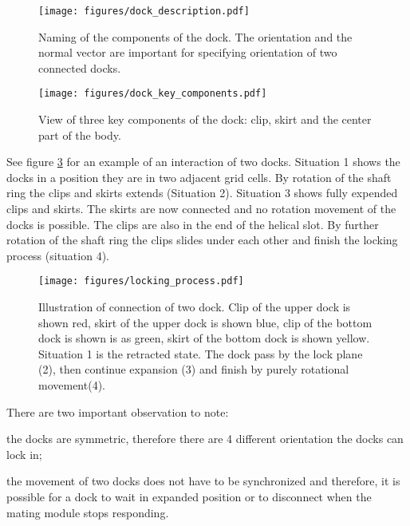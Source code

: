 \begin{figure}[h!]
    \centering
    \texttt{[image: figures/dock\_description.pdf]}
    \caption{Naming of the components of the dock. The orientation and the
    normal vector are important for specifying orientation of two connected
    docks. }
    \label{fig:dock_description}
\end{figure}

\begin{figure}[h!]
    \centering
    \texttt{[image: figures/dock\_key\_components.pdf]}
    \caption{View of three key components of the dock: clip, skirt and the
    center part of the body.}
    \label{fig:dock_key_components}
\end{figure}

See figure \ref{fig:dock_locking_process} for an example of an interaction of
two docks. Situation 1 shows the docks in a position they are in two adjacent
grid cells. By rotation of the shaft ring the clips and skirts extends
(Situation 2). Situation 3 shows fully expended clips and skirts. The skirts are
now connected and no rotation movement of the docks is possible. The clips are
also in the end of the helical slot. By further rotation of the shaft ring the
clips slides under each other and finish the locking process (situation 4).

\begin{figure}[h!]
    \centering
    \texttt{[image: figures/locking\_process.pdf]}
    \caption{Illustration of connection of two dock. Clip of the upper dock is
    shown red, skirt of the upper dock is shown blue, clip of the bottom dock is
    shown is as green, skirt of the bottom dock is shown yellow.  Situation 1 is
    the retracted state. The dock pass by the lock plane (2), then continue
    expansion (3) and finish by purely rotational movement(4). }
    \label{fig:dock_locking_process}
\end{figure}

There are two important observation to note:
\begin{enumerate*}
    \item the docks are symmetric, therefore there are 4 different orientation
    the docks can lock in;
    \item the movement of two docks does not have to be synchronized and
    therefore, it is possible for a dock to wait in expanded position or to
    disconnect when the mating module stops responding.
\end{enumerate*}

